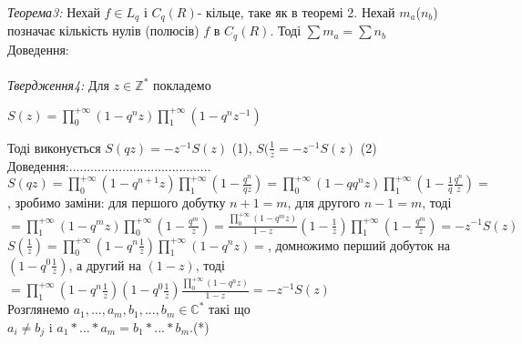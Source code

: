 \documentclass[12pt,a4paper]{article}
\begin{document}
\emph{Теорема3:} Нехай $f\in L_{q}$ і $C_{q}(R)$- кільце, таке як в теоремі 2. Нехай $m_{a}$($n_{b}$) позначає кількість нулів (полюсів) $f$ в $C_{q}(R)$. Тоді $\sum m_{a}=\sum n_{b}$ \\
Доведення:\\
\\

\emph{Твердження4:} Для $z \in \mathbb{Z}^{*}$ покладемо
  \begin{center}
	$S(z)= \prod_{0}^{+\infty } ( 1-q^{n}z ) \prod_{1}^{+\infty }( 1-q^{n}z^{-1} )$
  \end{center} Тоді виконується $S(qz)=-z^{-1}S(z)$ (1), $S(\frac{1}{z}=-z^{-1}S(z)$ (2)\\
Доведення:........................................\\
$S(qz)= \prod_{0}^{+\infty } ( 1-q^{n+1}z ) \prod_{1}^{+\infty }( 1-\frac{q^{n}}{qz})=
 \prod_{0}^{+\infty } ( 1-qq^{n}z ) \prod_{1}^{+\infty }( 1-\frac{1}{q}\frac{q^{n}}{z})=$, зробимо заміни: для першого добутку $n+1=m$, для другого $n-1=m$, тоді $=\prod_{1}^{+\infty } ( 1-q^{m}z ) \prod_{0}^{+\infty }( 1-\frac{q^{m}}{z})=\frac{\prod_{0}^{+\infty } ( 1-q^{m}z )}{1-z}(1-\frac{1}{z})\prod_{1}^{+\infty }( 1-\frac{q^{m}}{z})=-z^{-1}S(z)$ \\
 $S(\frac{1}{z})= \prod_{0}^{+\infty } ( 1-q^{n}\frac{1}{z} ) \prod_{1}^{+\infty }( 1-q^{n}z)=$, домножимо перший добуток на $(1-q^{0}\frac{1}{z})$, а другий на $(1-z)$, тоді $=\prod_{1}^{+\infty } ( 1-q^{n}\frac{1}{z} )(1-q^{0}\frac{1}{z})\frac{ \prod_{0}^{+\infty }( 1-q^{n}z)}{1-z}=-z^{-1}S(z)$\\
 
Розглянемо $a_{1},...,a_{m},b_{1},...,b_{m}\in \mathbb{C}^{*}$ такі що\\
 $a_{i}\neq b_{j}$ i $a_{1}*...*a_{m}=b_{1}*...*b_{m}$.(*)\\
\end{document}
